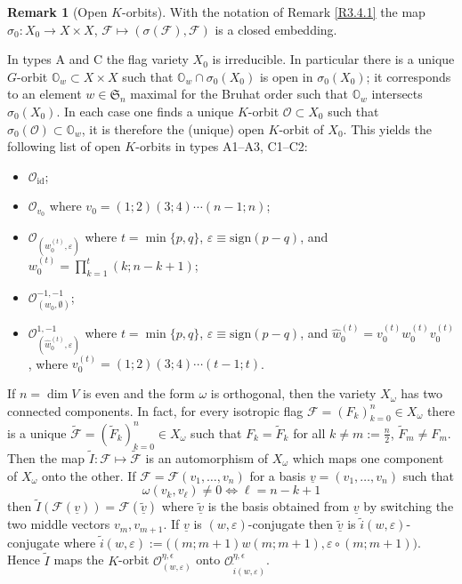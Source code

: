 \documentclass{amsart}
\theoremstyle{definition}
\newtheorem{remark}{Remark}
\begin{document}
\begin{remark}[Open $K$-orbits]
\label{R-open}
With the notation of Remark \ref{R3.4.1} the map $\sigma_0:X_0\to X\times X$, $\mathcal{F}\mapsto(\sigma(\mathcal{F}),\mathcal{F})$ is a closed embedding.

In types A and C the flag variety $X_0$ is irreducible.
In particular there is a unique $G$-orbit $\mathbb{O}_w\subset X\times X$
such that $\mathbb{O}_w\cap \sigma_0(X_0)$ is open in $\sigma_0(X_0)$;
it corresponds to an element $w\in\mathfrak{S}_n$ maximal for the Bruhat order such that $\mathbb{O}_w$ intersects $\sigma_0(X_0)$.
In each case one finds a unique $K$-orbit $\mathcal{O}\subset X_0$ such that $\sigma_0(\mathcal{O})\subset\mathbb{O}_w$, it is therefore the (unique) open $K$-orbit of $X_0$.
This yields the following list of open $K$-orbits in types A1--A3, C1--C2:
\begin{itemize}
\item[\rm A1:] $\mathcal{O}_\mathrm{id}$;
\item[\rm A2:] $\mathcal{O}_{v_0}$ where $v_0=(1;2)(3;4)\cdots(n-1;n)$;
\item[\rm A3:] $\mathcal{O}_{(w_0^{(t)},\varepsilon)}$ where 
$t=\min\{p,q\}$, $\varepsilon\equiv\mathrm{sign}(p-q)$,
and $w^{(t)}_0=\prod\limits_{k=1}^t(k;n-k+1)$;
\item[\rm C1:] $\mathcal{O}^{-1,-1}_{(w_0,\emptyset)}$;
\item[\rm C2:] $\mathcal{O}^{1,-1}_{(\hat{w}_0^{(t)},\varepsilon)}$
where $t=\min\{p,q\}$, $\varepsilon\equiv\mathrm{sign}(p-q)$, and $\hat{w}_0^{(t)}=v_0^{(t)}w_0^{(t)}v_0^{(t)}$,
where $v_0^{(t)}=(1;2)(3;4)\cdots(t-1;t)$.
\end{itemize}

If $n=\dim V$ is even and the form $\omega$ is orthogonal, then the variety $X_\omega$ has two connected components.
In fact, for every isotropic flag $\mathcal{F}=(F_k)_{k=0}^n\in X_\omega$ there is a unique $\tilde{\mathcal{F}}=(\tilde{F}_k)_{k=0}^n\in X_\omega$
such that $F_k=\tilde{F}_k$ for all $k\not=m:=\frac{n}{2}$, $\tilde{F}_m\not=F_m$.
Then the map $\tilde{I}:\mathcal{F}\mapsto\tilde{\mathcal{F}}$ is an automorphism
of $X_\omega$ which maps one component of $X_\omega$ onto the other.
If $\mathcal{F}=\mathcal{F}(v_1,\ldots,v_n)$ for a basis $\underline{v}=(v_1,\ldots,v_n)$ such that 
\[\omega(v_k,v_\ell)\not=0\Leftrightarrow \ell=n-k+1\]
then
$\tilde{I}(\mathcal{F}(\underline{v}))=\mathcal{F}(\underline{\tilde{v}})$
where $\underline{\tilde{v}}$ is the basis obtained from $\underline{v}$ by switching the two middle vectors $v_m,v_{m+1}$.
If $\underline{v}$ is $(w,\varepsilon)$-conjugate then $\underline{\tilde{v}}$ is $\tilde{i}(w,\varepsilon)$-conjugate where
$\tilde{i}(w,\varepsilon):=\big((m;m+1)w(m;m+1),\varepsilon\circ(m;m+1)\big)$.
Hence $\tilde{I}$ maps the $K$-orbit $\mathcal{O}^{\eta,\epsilon}_{(w,\varepsilon)}$
onto $\mathcal{O}^{\eta,\epsilon}_{\tilde{i}(w,\varepsilon)}$.


\end{remark}
\end{document}
